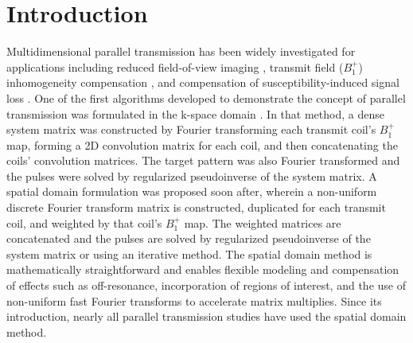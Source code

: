 \section* {Introduction}

\par Multidimensional parallel transmission \cite{Katscher:2003:Magn-Reson-Med:12509830,zhu2004parallel} has been widely investigated for applications including
reduced field-of-view imaging \cite{malik:mrm:2015,mooiweer:2016},
transmit field ($B_1^+$) inhomogeneity compensation \cite{Zhang:2007:Magn-Reson-Med:16526012,cloos:kpstd:2012},
and compensation of susceptibility-induced signal loss \cite{deng:2009}.
One of the first algorithms developed to demonstrate the concept of parallel transmission was formulated in the k-space domain \cite{Katscher:2003:Magn-Reson-Med:12509830}.
In that method, a dense system matrix was constructed by Fourier transforming each transmit coil's $B_1^+$ map,
forming a 2D convolution matrix for each coil, and then concatenating the coils' convolution matrices.
The target pattern was also Fourier transformed and the pulses were solved by regularized pseudoinverse of the system matrix. 
A spatial domain formulation \cite{Grissom:2006:MRM} was proposed soon after,
wherein a non-uniform discrete Fourier transform matrix is constructed, 
duplicated for each transmit coil, and weighted by that coil's $B_1^+$ map.
The weighted matrices are concatenated and the pulses are solved by regularized pseudoinverse of the system matrix
or using an iterative method.
The spatial domain method is mathematically straightforward 
and enables flexible modeling and compensation of effects such as off-resonance, 
incorporation of regions of interest,
and the use of non-uniform fast Fourier transforms to accelerate matrix multiplies.
Since its introduction, nearly all parallel transmission studies have used the spatial domain method. 

